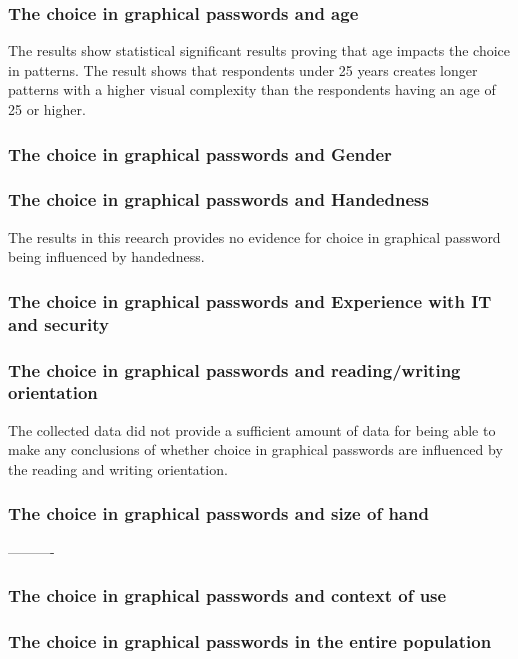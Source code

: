    \subsubsection*{The choice in graphical passwords and age}
    The results show statistical significant results proving that age impacts the choice in patterns. 
    The result shows that respondents under 25 years creates longer patterns with a higher visual complexity than the respondents having an age of 25 or higher. 

    \subsubsection*{The choice in graphical passwords and Gender}

    \subsubsection*{The choice in graphical passwords and Handedness}
    The results in this reearch provides no evidence for choice in graphical password being influenced by handedness.

    \subsubsection*{The choice in graphical passwords and Experience with IT and security}

    \subsubsection*{The choice in graphical passwords and reading/writing orientation}
    The collected data did not provide a sufficient amount of data for being able to make any conclusions of whether choice in graphical passwords are influenced by the reading and writing orientation.

    \subsubsection*{The choice in graphical passwords and size of hand}

  ----------

    \subsubsection*{The choice in graphical passwords and context of use}

    \subsubsection*{The choice in graphical passwords in the entire population}

